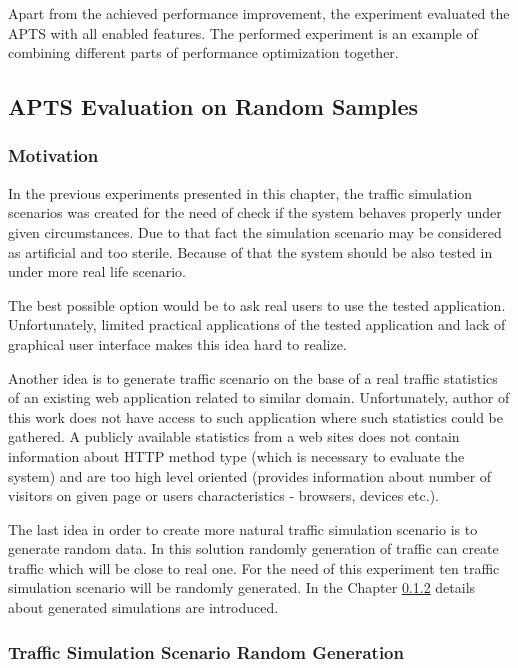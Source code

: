 \documentclass[12pt,a4paper]{article}
\begin{document}
Apart from the achieved performance improvement, the experiment evaluated the APTS with all enabled features. The performed experiment is an example of combining different parts of performance optimization together. 


\subsection{APTS Evaluation on Random Samples}

\subsubsection{Motivation}
In the previous experiments presented in this chapter, the traffic simulation scenarios was created for the need of check if the system behaves properly under given circumstances. Due to that fact the simulation scenario may be considered as artificial and too sterile. Because of that the system should be also tested in under more real life scenario. 

The best possible option would be to ask real users to use the tested application. Unfortunately, limited practical applications of the tested application and lack of graphical user interface makes this idea hard to realize. 

Another idea is to generate traffic scenario on the base of a real traffic statistics of an existing web application related to similar domain. Unfortunately, author of this work does not have access to such application where such statistics could be gathered. A publicly available statistics from a web sites does not contain information about HTTP method type (which is necessary to evaluate the system) and are too high level oriented (provides information about number of visitors on given page or users characteristics - browsers, devices etc.).  

The last idea in order to create more natural traffic simulation scenario is to generate random data. In this solution randomly generation of traffic can create traffic which will be close to real one. For the need of this experiment ten traffic simulation scenario will be randomly generated. In the Chapter \ref{section:randomgeneration} details about generated simulations are introduced. 

\subsubsection{Traffic Simulation Scenario Random Generation} \label{section:randomgeneration}
\end{document}
